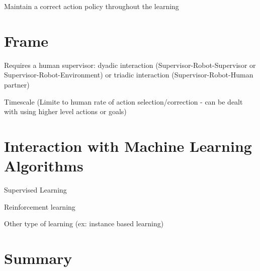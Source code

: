 Maintain a correct action policy throughout the learning

\section{Frame}

Requires a human supervisor: dyadic interaction (Supervisor-Robot-Supervisor or
Supervisor-Robot-Environment) or triadic interaction (Supervisor-Robot-Human
partner)

Timescale (Limite to human rate of action selection/correction - can be dealt
with using higher level actions or goals)

\section{Interaction with Machine Learning Algorithms}

Supervised Learning

Reinforcement learning 

Other type of learning (ex: instance based learning)

\section{Summary}
    
    

